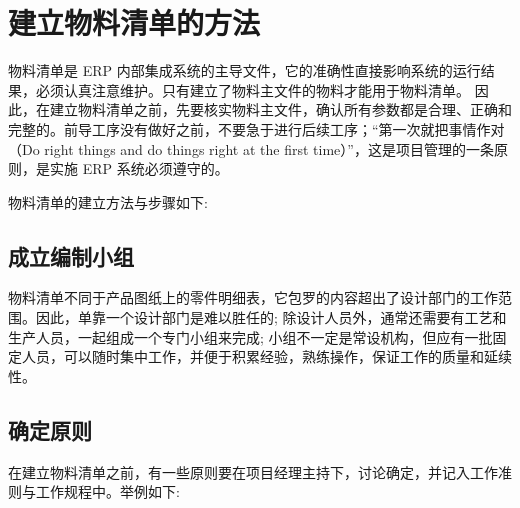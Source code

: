 \section {建立物料清单的方法}

    物料清单是 ERP 内部集成系统的主导文件，它的准确性直接影响系统的运行结果，必须认真注意维护。只有建立了物料主文件的物料才能用于物料清单。 因此，在建立物料清单之前，先要核实物料主文件，确认所有参数都是合理、正确和完整的。前导工序没有做好之前，不要急于进行后续工序；“第一次就把事情作对（Do right things and do things right at the ﬁrst time）”，这是项目管理的一条原则，是实施 ERP 系统必须遵守的。

    物料清单的建立方法与步骤如下:

\subsection {成立编制小组}

        物料清单不同于产品图纸上的零件明细表，它包罗的内容超出了设计部门的工作范围。因此，单靠一个设计部门是难以胜任的; 除设计人员外，通常还需要有工艺和生产人员，一起组成一个专门小组来完成; 小组不一定是常设机构，但应有一批固定人员，可以随时集中工作，并便于积累经验，熟练操作，保证工作的质量和延续性。

\subsection {确定原则}

        在建立物料清单之前，有一些原则要在项目经理主持下，讨论确定，并记入工作准则与工作规程中。举例如下:

